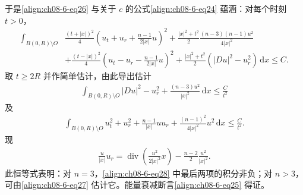 \documentclass[../../main.tex]{subfiles}
\begin{document}
于是\eqref{align:ch08-6-eq26} 与关于 $c$ 的公式\eqref{align:ch08-6-eq24} 蕴涵：对每个时刻 $t>0$，
\begin{align*}
\int_{B(0,R)\setminus O}&\frac{(t+|x|)^2}{4}\left(u_t+u_r+\frac{n-1}{2|x|}u\right)^2+\frac{|x|^2+t^2}{2}\frac{(n-3)(n-1)u^2}{4|x|^2}\\
&+\frac{(t-|x|)^2}{4}\left(u_t-u_r-\frac{n-1}{2|x|}u\right)^2+\frac{|x|^2+t^2}{2}(|Du|^2-u_r^2)\,\mathrm{d}x\leqslant C.
\end{align*}
取 $t\geqslant 2R$ 并作简单估计，由此导出估计
\begin{align}
\int_{B(0,R)\setminus O}|Du|^2-u_r^2+\frac{(n-3)u^2}{|x|^2}\,\mathrm{d}x\leqslant\frac{C}{t^2}\label{align:ch08-6-eq27}
\end{align}
及
\begin{align}
\int_{B(0,R)\setminus O}u_t^2+u_r^2+\frac{n-1}{|x|}uu_r+\frac{(n-1)^2}{4|x|^2}u^2\,\mathrm{d}x\leqslant\frac{C}{t^2}.\label{align:ch08-6-eq28}
\end{align}
现
\begin{align*}
\frac{u}{|x|}u_r=\operatorname{div}\!\left(\frac{u^2}{2|x|^2}x\right)-\frac{n-2}{2}\frac{u^2}{|x|^2}.
\end{align*}
此恒等式表明：对 $n=3$，\eqref{align:ch08-6-eq28} 中最后两项的积分非负；对 $n>3$，可由\eqref{align:ch08-6-eq27} 估计它。能量衰减断言\eqref{align:ch08-6-eq25} 得证。
\end{document}
